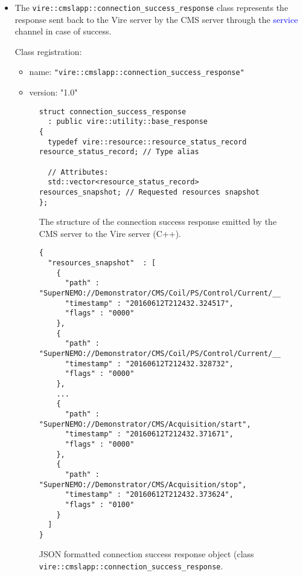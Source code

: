 \begin{itemize}
\item  The  \texttt{vire::cmslapp::connection\_success\_response}
  class represents  the response sent back  to the Vire server  by the
  CMS server through the  \textcolor{blue}{service} channel in case of
  success.

\begin{center}
\end{center}

\noindent Class registration:
\begin{itemize}
\item name: \texttt{"vire::cmslapp::connection\_success\_response"}
\item version: "1.0"
\end{itemize}

\begin{figure}[h]
\vskip 10pt
\small
\begin{Verbatim}[frame=single,xleftmargin=0.cm,label=\fbox{C++}]
struct connection_success_response
  : public vire::utility::base_response
{
  typedef vire::resource::resource_status_record resource_status_record; // Type alias

  // Attributes:
  std::vector<resource_status_record> resources_snapshot; // Requested resources snapshot
};
\end{Verbatim}
\normalsize
\caption{The structure  of the connection success  response emitted by
  the CMS server to the Vire server (C++).}
\label{fig-app-payload-connection_success_response}
\end{figure}



\begin{figure}[h]
\vskip 10pt
\small
\begin{Verbatim}[frame=single,xleftmargin=0.cm,label=\fbox{\texttt{JSON}}]
{
  "resources_snapshot"  : [
    {
      "path" : "SuperNEMO://Demonstrator/CMS/Coil/PS/Control/Current/__dp_read__",
      "timestamp" : "20160612T212432.324517",
      "flags" : "0000"
    },
    {
      "path" : "SuperNEMO://Demonstrator/CMS/Coil/PS/Control/Current/__dp_write__",
      "timestamp" : "20160612T212432.328732",
      "flags" : "0000"
    },
    ...
    {
      "path" : "SuperNEMO://Demonstrator/CMS/Acquisition/start",
      "timestamp" : "20160612T212432.371671",
      "flags" : "0000"
    },
    {
      "path" : "SuperNEMO://Demonstrator/CMS/Acquisition/stop",
      "timestamp" : "20160612T212432.373624",
      "flags" : "0100"
    }
  ]
}
\end{Verbatim}
\normalsize
\caption[JSON formatted  connection success response]  {JSON formatted
  connection        success        response       object        (class
  \texttt{vire::cmslapp::connection\_success\_response}.}
\label{fig-app-payload-connection_success_response-json}
\end{figure}



\end{itemize}
